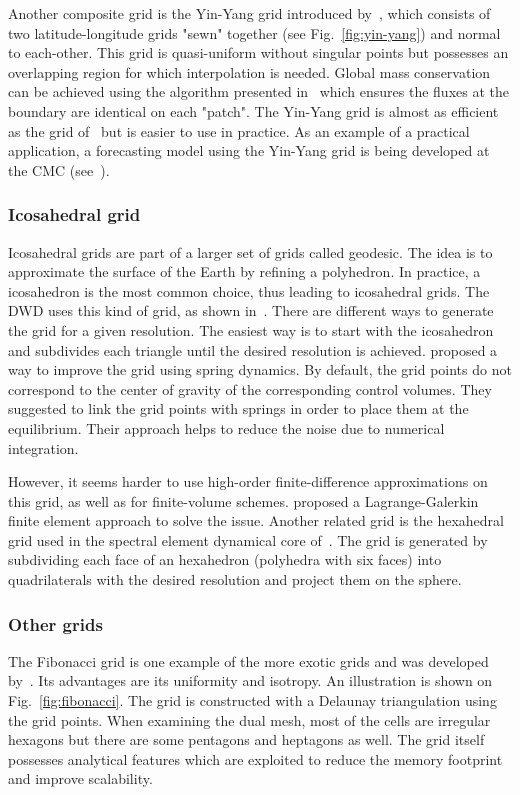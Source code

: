 Another composite grid is the Yin-Yang grid introduced by~\cite{Kageyama2004},
which consists of two latitude-longitude grids "sewn" together (see
Fig.~\ref{fig:yin-yang}) and normal to each-other.
This grid is quasi-uniform without singular points but possesses an overlapping
region for which interpolation is needed. Global mass conservation can be
achieved using the algorithm presented in~\cite{Peng2006} which ensures the
fluxes at the boundary are identical on each "patch". The Yin-Yang grid is
almost as efficient as the grid of~\cite{Phillips1957} but is easier to use in
practice. As an example of a practical application, a forecasting model using
the Yin-Yang grid is being developed at the \gls{CMC}
(see~\cite{Qaddouri2011}).

\subsubsection{Icosahedral grid}
Icosahedral grids are part of a larger set of grids called geodesic. The idea is
to approximate the surface of the Earth by refining a polyhedron. In practice, a
icosahedron is the most common choice, thus leading to icosahedral grids. The
\gls{DWD} uses this kind of grid, as shown in~\cite{Majewski2002}. There are
different ways to generate the grid for a given resolution. The easiest way is
to start with the icosahedron and subdivides each triangle until the desired
resolution is achieved. \cite{Tomita2001} proposed a way to improve the grid
using spring dynamics. By default, the grid points do not correspond to the
center of gravity of the corresponding control volumes. They suggested to link the
grid points with springs in order to place them at the equilibrium. Their approach
helps to reduce the noise due to numerical integration.

However, it seems harder to use high-order finite-difference approximations on
this grid, as well as for finite-volume schemes. \cite{Giraldo2000} 
proposed a Lagrange-Galerkin finite element approach to solve the issue.
Another related grid is the hexahedral grid used in the spectral element
dynamical core of~\cite{Giraldo2003}. The grid is generated by subdividing each
face of an hexahedron (polyhedra with six faces) into quadrilaterals with the
desired resolution and project them on the sphere.

\subsubsection{Other grids}
The Fibonacci grid is one example of the more exotic grids and was developed
by~\cite{Swinbank2006}. Its advantages are its uniformity and isotropy. An
illustration is shown on Fig.~\ref{fig:fibonacci}.
The grid is constructed with a Delaunay triangulation using the grid points.
When examining the dual mesh, most of the cells are irregular hexagons but there
are some pentagons and heptagons as well. The grid itself possesses analytical
features which are exploited to reduce the memory footprint and improve
scalability.

